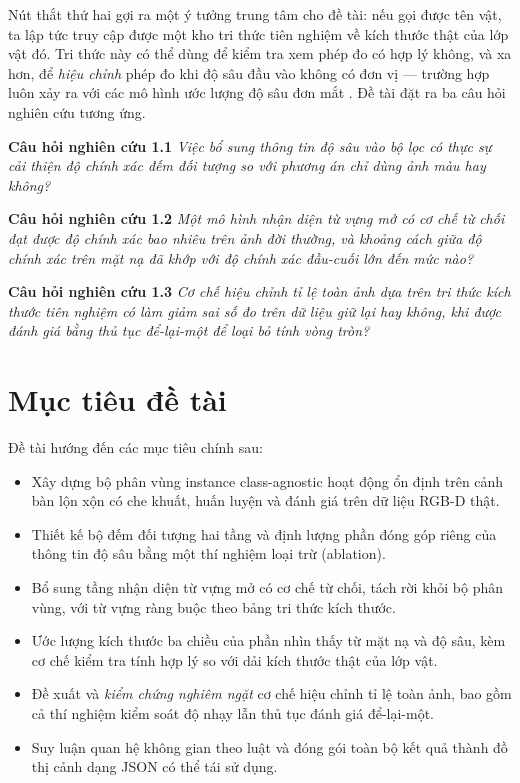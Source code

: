 Nút thắt thứ hai gợi ra một ý tưởng trung tâm cho đề tài: nếu gọi được tên vật, ta lập tức truy
cập được một kho tri thức tiên nghiệm về kích thước thật của lớp vật đó. Tri thức này có thể
dùng để kiểm tra xem phép đo có hợp lý không, và xa hơn, để \emph{hiệu chỉnh} phép đo khi độ sâu
đầu vào không có đơn vị --- trường hợp luôn xảy ra với các mô hình ước lượng độ sâu đơn mắt
\cite{ranftl2020midas}. Đề tài đặt ra ba câu hỏi nghiên cứu tương ứng.

\noindent\textbf{Câu hỏi nghiên cứu 1.1} \textit{Việc bổ sung thông tin độ sâu vào bộ lọc có
thực sự cải thiện độ chính xác đếm đối tượng so với phương án chỉ dùng ảnh màu hay không?}

\noindent\textbf{Câu hỏi nghiên cứu 1.2} \textit{Một mô hình nhận diện từ vựng mở có cơ chế từ
chối đạt được độ chính xác bao nhiêu trên ảnh đời thường, và khoảng cách giữa độ chính xác trên
mặt nạ đã khớp với độ chính xác đầu-cuối lớn đến mức nào?}

\noindent\textbf{Câu hỏi nghiên cứu 1.3} \textit{Cơ chế hiệu chỉnh tỉ lệ toàn ảnh dựa trên tri
thức kích thước tiên nghiệm có làm giảm sai số đo trên dữ liệu giữ lại hay không, khi được đánh
giá bằng thủ tục để-lại-một để loại bỏ tính vòng tròn?}

\section{Mục tiêu đề tài}

Đề tài hướng đến các mục tiêu chính sau:

\begin{itemize}[leftmargin=1.5cm]
\item Xây dựng bộ phân vùng instance class-agnostic hoạt động ổn định trên cảnh bàn lộn xộn có
che khuất, huấn luyện và đánh giá trên dữ liệu RGB-D thật.
\item Thiết kế bộ đếm đối tượng hai tầng và định lượng phần đóng góp riêng của thông tin độ sâu
bằng một thí nghiệm loại trừ (ablation).
\item Bổ sung tầng nhận diện từ vựng mở có cơ chế từ chối, tách rời khỏi bộ phân vùng, với từ
vựng ràng buộc theo bảng tri thức kích thước.
\item Ước lượng kích thước ba chiều của phần nhìn thấy từ mặt nạ và độ sâu, kèm cơ chế kiểm tra
tính hợp lý so với dải kích thước thật của lớp vật.
\item Đề xuất và \emph{kiểm chứng nghiêm ngặt} cơ chế hiệu chỉnh tỉ lệ toàn ảnh, bao gồm cả thí
nghiệm kiểm soát độ nhạy lẫn thủ tục đánh giá để-lại-một.
\item Suy luận quan hệ không gian theo luật và đóng gói toàn bộ kết quả thành đồ thị cảnh dạng
JSON có thể tái sử dụng.
\end{itemize}

